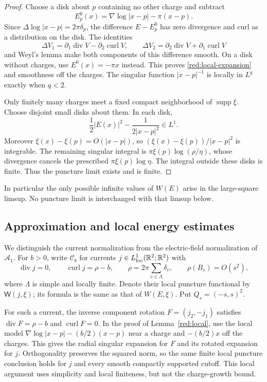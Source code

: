 \begin{proof}
Choose a disk about $p$ containing no other charge and subtract
\[
 E_p^0(x)=\nabla\log|x-p|-\pi(x-p).
\]
Since $\Delta\log|x-p|=2\pi\delta_p$, the difference
$E-E_p^0$ has zero divergence and curl as a distribution on the disk.
The identities
\[
 \Delta V_1=\partial_1\operatorname{div}V-
                 \partial_2\operatorname{curl}V,
 \qquad
 \Delta V_2=\partial_2\operatorname{div}V+
                 \partial_1\operatorname{curl}V
\]
and Weyl's lemma make both components of this difference smooth.
On a disk without charges, use $E^0(x)=-\pi x$ instead.
This proves \eqref{red:local-expansion} and smoothness off the charges.
The singular function $|x-p|^{-1}$ is locally in $L^q$ exactly when
$q<2$.

Only finitely many charges meet a fixed compact neighborhood of
$\operatorname{supp}\xi$.  Choose disjoint small disks about them.
In each disk,
\[
 \frac12|E(x)|^2-\frac1{2|x-p|^2}\in L^1.
\]
Moreover $\xi(x)-\xi(p)=O(|x-p|)$, so
$(\xi(x)-\xi(p))/|x-p|^2$ is integrable.  The remaining singular
integral is $\pi\xi(p)\log(\rho/\eta)$, whose divergence cancels
the prescribed $\pi\xi(p)\log\eta$.  The integral outside these
disks is finite.  Thus the puncture limit exists and is finite.
\end{proof}

In particular the only possible infinite values of $W(E)$ arise in
the large-square limsup.  No puncture limit is interchanged with that
limsup below.

\subsection{Approximation and local energy estimates}

We distinguish the current normalization from the electric-field
normalization of $\mathcal A_1$.  For $b>0$, write $\mathcal C_b$ for
currents $j\in L^1_{\mathrm{loc}}(\mathbb R^2;\mathbb R^2)$
with
\[
 \operatorname{div}j=0,\qquad
 \operatorname{curl}j=\rho-b,\qquad
 \rho=2\pi\sum_{v\in\Lambda}\delta_v,
 \qquad \rho(B_s)=O(s^2),
\]
where $\Lambda$ is simple and locally finite.  Denote their local
puncture functional by $\mathsf W(j,\xi)$; its formula is the same
as that of $W(E,\xi)$.  Put $Q_s=(-s,s)^2$.

For such a current, the inverse component rotation $F=(j_2,-j_1)$
satisfies $\operatorname{div}F=\rho-b$ and $\operatorname{curl}F=0$.
In the proof of Lemma~\ref{red:local}, use the local model
$\nabla\log|x-p|-(b/2)(x-p)$ near a charge and $-(b/2)x$ off the
charges.  This gives the radial singular expansion for $F$ and its
rotated expansion for $j$.  Orthogonality preserves the squared norm,
so the same finite local puncture conclusion holds for $j$ and every
smooth compactly supported cutoff.  This local argument uses simplicity
and local finiteness, but not the charge-growth bound.

